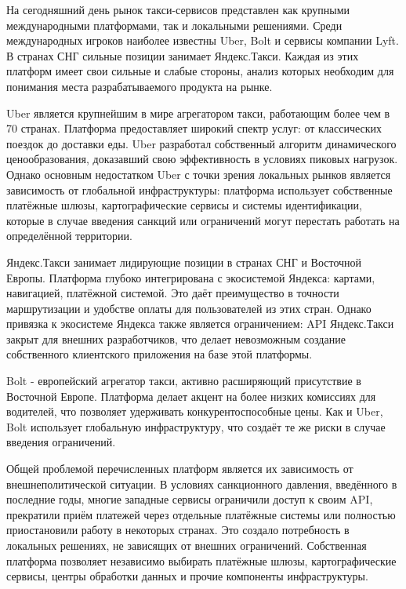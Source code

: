 	{\gostFont
		
		\par \redline На сегодняшний день рынок такси-сервисов представлен как крупными международными платформами, так и локальными решениями. Среди международных игроков наиболее известны Uber, Bolt и сервисы компании Lyft. В странах СНГ сильные позиции занимает Яндекс.Такси. Каждая из этих платформ имеет свои сильные и слабые стороны, анализ которых необходим для понимания места разрабатываемого продукта на рынке.
		
		\par \redline Uber является крупнейшим в мире агрегатором такси, работающим более чем в 70 странах. Платформа предоставляет широкий спектр услуг: от классических поездок до доставки еды. Uber разработал собственный алгоритм динамического ценообразования, доказавший свою эффективность в условиях пиковых нагрузок. Однако основным недостатком Uber с точки зрения локальных рынков является зависимость от глобальной инфраструктуры: платформа использует собственные платёжные шлюзы, картографические сервисы и системы идентификации, которые в случае введения санкций или ограничений могут перестать работать на определённой территории.
		
		\par \redline Яндекс.Такси занимает лидирующие позиции в странах СНГ и Восточной Европы. Платформа глубоко интегрирована с экосистемой Яндекса: картами, навигацией, платёжной системой. Это даёт преимущество в точности маршрутизации и удобстве оплаты для пользователей из этих стран. Однако привязка к экосистеме Яндекса также является ограничением: API Яндекс.Такси закрыт для внешних разработчиков, что делает невозможным создание собственного клиентского приложения на базе этой платформы.
		
		\par \redline Bolt - европейский агрегатор такси, активно расширяющий присутствие в Восточной Европе. Платформа делает акцент на более низких комиссиях для водителей, что позволяет удерживать конкурентоспособные цены. Как и Uber, Bolt использует глобальную инфраструктуру, что создаёт те же риски в случае введения ограничений.
		
		\par \redline Общей проблемой перечисленных платформ является их зависимость от внешнеполитической ситуации. В условиях санкционного давления, введённого в последние годы, многие западные сервисы ограничили доступ к своим API, прекратили приём платежей через отдельные платёжные системы или полностью приостановили работу в некоторых странах. Это создало потребность в локальных решениях, не зависящих от внешних ограничений. Собственная платформа позволяет независимо выбирать платёжные шлюзы, картографические сервисы, центры обработки данных и прочие компоненты инфраструктуры.
		
}
